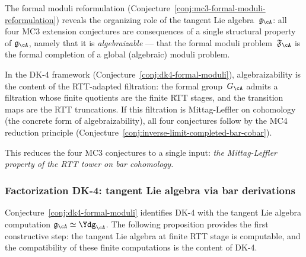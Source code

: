 \begin{remark}
\label{rem:tangent-controls-extension}
The formal moduli reformulation
(Conjecture~\ref{conj:mc3-formal-moduli-reformulation})
reveals the organizing role of the tangent Lie
algebra~$\mathfrak{g}_{\cA}$: all four MC3 extension
conjectures are consequences of a single structural property of
$\mathfrak{g}_{\cA}$, namely that it is \emph{algebraizable} ---
that the formal moduli problem~$\mathfrak{F}_{\cA}$ is the
formal completion of a global (algebraic) moduli problem.

In the DK-4 framework
(Conjecture~\ref{conj:dk4-formal-moduli}), algebraizability is the
content of the RTT-adapted filtration: the formal
group~$G_{\cA}$ admits a filtration whose finite quotients are
the finite RTT stages, and the transition maps are the RTT
truncations.  If this filtration is Mittag-Leffler on cohomology
(the concrete form of algebraizability), all four conjectures
follow by the MC4 reduction principle
(Conjecture~\ref{conj:inverse-limit-completed-bar-cobar}).

This reduces the four MC3 conjectures to a single input:
\emph{the Mittag-Leffler property of the RTT tower on bar
cohomology.}
\end{remark}

\subsubsection*{Factorization DK-4: tangent Lie algebra via
bar derivations}

Conjecture~\ref{conj:dk4-formal-moduli} identifies DK-4 with the
tangent Lie algebra computation
$\mathfrak{g}_{\cA} \simeq \Ydg_{\cA}$.
The following proposition provides the first constructive step:
the tangent Lie algebra at finite RTT stage is computable,
and the compatibility of these finite computations is the
content of DK-4.

